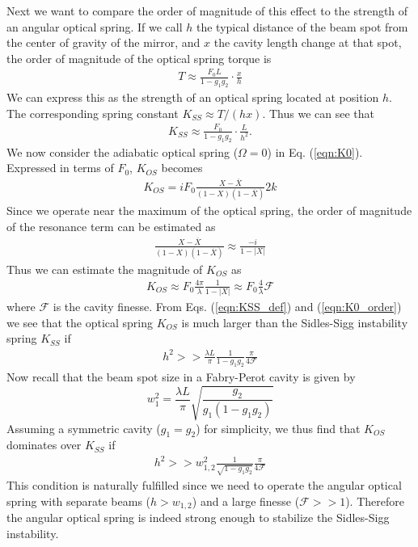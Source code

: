 Next we want to compare the order of magnitude of this effect to the strength of an angular optical spring. If we call $h$ the typical distance of the beam spot from the center of gravity of the mirror, and $x$ the cavity length change at that spot, the order of magnitude of the optical spring torque is
\begin{align}
T\approx \frac{F_0 L}{1-g_1g_2}\cdot \frac{x}{h}
\end{align}
We can express this as the strength of an optical spring located at position $h$. The corresponding spring constant $K_{SS} \approx T/(h x)$. Thus we can see that
\begin{align}
\label{eqn:KSS_def}
K_{SS} \approx \frac{F_0}{1-g_1g_2}\cdot \frac{L}{h^2}.
\end{align}
We now consider the adiabatic optical spring ($\Omega=0$) in Eq. (\ref{eqn:K0}).  Expressed in terms of $F_0$, $K_{OS}$ becomes
\begin{align}
\label{eqn:KOS_exact}
K_{OS}=i F_0 \frac{X-\overline{X}}{(1-X)(1-\overline{X})}   2 k
\end{align}
Since we operate near the maximum of the optical spring, the order of magnitude of the resonance term can be estimated as
\begin{align}
\label{eqn:res_est}
\frac{X-\overline{X}}{(1-X)(1-\overline{X})} \approx \frac{-i}{1-|X|}
\end{align}
Thus we can estimate the magnitude of  $K_{OS}$ as
\begin{align}
\label{eqn:K0_order}
K_{OS} \approx F_0 \frac{4\pi}{\lambda}\frac{1}{1-|X|} \approx F_0 \frac{4}{\lambda} \mathcal{F}
\end{align}
where $\mathcal{F}$ is the cavity finesse.
From Eqs. (\ref{eqn:KSS_def}) and (\ref{eqn:K0_order}) we see that the optical spring $K_{OS}$  is much larger than the Sidles-Sigg instability spring $K_{SS}$ if
\begin{align}
\label{eqn:h2}
h^2 >> \frac{\lambda L}{\pi} \frac{1}{1-g_1 g_2} \frac{\pi}{4 \mathcal{F}}
\end{align}
Now recall that the beam spot size in a Fabry-Perot cavity is given by \cite{Siegman86}
\begin{equation}
w_1^2 = \frac{\lambda L}{\pi} \sqrt{\frac{g_2}{g_1(1-g_1 g_2)}}
\label{equ:spotsize1}
\end{equation} 
Assuming a symmetric cavity ($g_1=g_2$) for simplicity, we thus find that $K_{OS}$  dominates over $K_{SS}$ if
\begin{align}
\label{eqn:h2w}
h^2 >> w_{1,2}^2 \frac{1}{\sqrt{1-g_1 g_2}} \frac{\pi}{4 \mathcal{F}}
\end{align}
This condition is naturally fulfilled since we need to operate the angular optical spring with separate beams ($h>w_{1,2}$) and a large finesse ($\mathcal{F}>>1$). Therefore the angular optical spring is indeed strong enough to stabilize the Sidles-Sigg instability.

